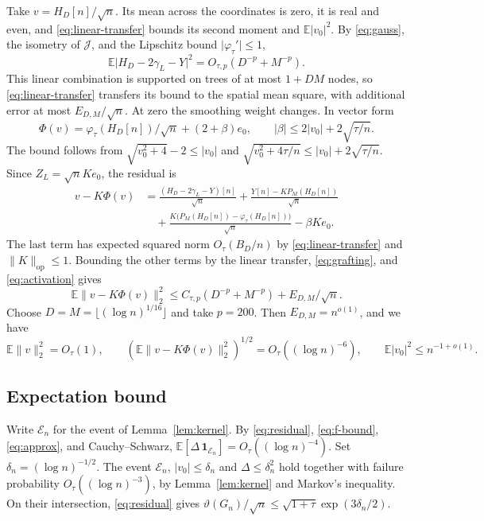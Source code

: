 \documentclass[preprints,article,submit,oneauthor]{Definitions/mdpi}
\newcommand{\E}{\mathbb E}
\newcommand{\one}{\mathbf 1}
\newcommand{\abs}[1]{\lvert #1\rvert}
\newcommand{\norm}[1]{\lVert #1\rVert}
\newcommand{\op}{\mathrm{op}}
\begin{document}
Take \(v=H_D[n]/\sqrt n\). Its mean across the coordinates is zero,
it is real and even, and \eqref{eq:linear-transfer} bounds its second
moment and \(\E\abs{v_0}^2\). By \eqref{eq:gauss}, the isometry of
\(\mathcal J\), and the Lipschitz bound \(\abs{\varphi_\tau'}\le1\),
\[
 \E\abs{H_D-2\gamma_L-Y}^2=O_{\tau,p}(D^{-p}+M^{-p}).
\]
This linear combination is supported on trees of at most \(1+DM\)
nodes, so \eqref{eq:linear-transfer} transfers its bound to the spatial
mean square, with additional error at most \(E_{D,M}/\sqrt n\).
At zero the smoothing weight changes. In vector form
\[
 \Phi(v)=\varphi_\tau(H_D[n])/\sqrt n+(2+\beta)e_0,
 \qquad \abs\beta\le 2\abs{v_0}+2\sqrt{\tau/n}.
\]
The bound follows from \(\sqrt{v_0^2+4}-2\le\abs{v_0}\) and
\(\sqrt{v_0^2+4\tau/n}\le\abs{v_0}+2\sqrt{\tau/n}\).
Since \(Z_L=\sqrt n K e_0\), the residual is
\begin{align*}
 v-K\Phi(v)
 &=\frac{(H_D-2\gamma_L-Y)[n]}{\sqrt n}
   +\frac{Y[n]-K P_M(H_D[n])}{\sqrt n}\\
 &\quad+\frac{K\bigl(P_M(H_D[n])-\varphi_\tau(H_D[n])\bigr)}{\sqrt n}
   -\beta K e_0.
\end{align*}
The last term has expected squared norm \(O_\tau(B_D/n)\) by
\eqref{eq:linear-transfer} and \(\norm K_{\op}\le1\).
Bounding the other terms by the linear transfer,
\eqref{eq:grafting}, and \eqref{eq:activation} gives
\[
 \E\norm{v-K\Phi(v)}_2^2
 \le C_{\tau,p}(D^{-p}+M^{-p})+E_{D,M}/\sqrt n.
\]
Choose \(D=M=\lfloor(\log n)^{1/16}\rfloor\) and take \(p=200\).
Then \(E_{D,M}=n^{o(1)}\), and we have
\begin{equation}\label{eq:approx}
 \E\norm v_2^2=O_\tau(1),\qquad
 (\E\norm{v-K\Phi(v)}_2^2)^{1/2}=O_\tau((\log n)^{-6}),\qquad
 \E\abs{v_0}^2\le n^{-1+o(1)}.
\end{equation}

\subsection{Expectation bound}

Write \(\mathcal E_n\) for the event of Lemma~\ref{lem:kernel}.
By \eqref{eq:residual}, \eqref{eq:f-bound}, \eqref{eq:approx}, and
Cauchy--Schwarz, \(\E[\Delta\,\one_{\mathcal E_n}]=O_\tau((\log n)^{-4})\).
Set \(\delta_n=(\log n)^{-1/2}\). The event \(\mathcal E_n\), \(\abs{v_0}\le\delta_n\)
and \(\Delta\le\delta_n^2\) hold together with failure probability
\(O_\tau((\log n)^{-3})\), by Lemma~\ref{lem:kernel} and Markov's
inequality. On their intersection,
\eqref{eq:residual} gives
\(\vartheta(G_n)/\sqrt n\le\sqrt{1+\tau}\exp(3\delta_n/2)\).
\end{document}
